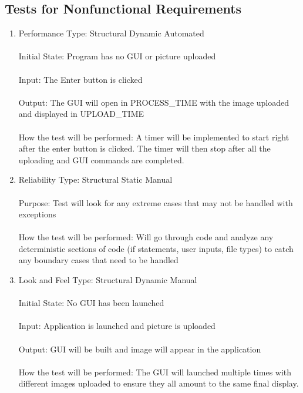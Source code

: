 \documentclass[12pt, titlepage]{article}
\begin{document}
\subsection{Tests for Nonfunctional Requirements}

\begin{enumerate}

\item{Performance}
Type: Structural Dynamic Automated \\ \\
Initial State: Program has no GUI or picture uploaded\\ \\
Input: The Enter button is clicked\\ \\
Output: The GUI will open in PROCESS_TIME with the image uploaded and displayed in UPLOAD_TIME \\ \\
How the test will be performed: A timer will be implemented to start right after the enter button is clicked. The timer will then stop after all the uploading and GUI commands are completed.

\item{Reliability}
Type: Structural Static Manual\\ \\
Purpose: Test will look for any extreme cases that may not be handled with exceptions\\ \\
How the test will be performed: Will go through code and analyze any deterministic sections of code (if statements, user inputs, file types) to catch any boundary cases that need to be handled

\item{Look and Feel}
Type: Structural Dynamic Manual\\ \\
Initial State: No GUI has been launched \\ \\
Input: Application is launched and picture is uploaded\\ \\
Output: GUI will be built and image will appear in the application\\ \\
How the test will be performed: The GUI will launched multiple times with different images uploaded to ensure they all amount to the same final display.


\end{enumerate}
\end{document}
